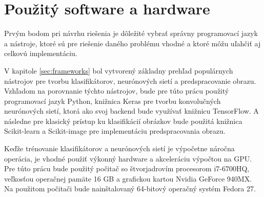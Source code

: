 
\section{Použitý software a hardware}
\label{sec:softwarehardware}
Prvým bodom pri návrhu riešenia je dôležité vybrať správny programovací jazyk a nástroje, ktoré sú pre riešenie daného problému vhodné
    a ktoré môžu uľahčiť aj celkovú implementáciu.

V kapitole \ref{sec:frameworks} bol vytvorený základny prehľad populárnych nástrojov pre tvorbu klasifikátorov, neurónových sietí a predspracovanie obrazu.
Vzhľadom na porovnanie týchto nástrojov, bude pre túto prácu použitý programovací jazyk Python, knižnica Keras pre tvorbu konvolučných neurónových sietí, ktorá
    ako svoj backend bude využívať knižnicu TensorFlow.
A následne pre klasický prístup ku klasifikácií obrázkov bude použitá knižnica Scikit-learn a Scikit-image pre implementáciu predspracovania obrazu.

Keďže trénovanie klasifikátorov a neurónových sietí je výpočetne náročna operácia, je vhodné použiť výkonný hardware a akceleráciu výpočtou na GPU.
Pre túto prácu bude použitý počitač so štvorjadrovím procesorom i7-6700HQ, veľkosťou operačnej pamäte 16 GB a grafickou kartou Nvidia GeForce 940MX.
Na použitom počitači bude nainštalovaný 64-bitový operačný systém Fedora 27.
